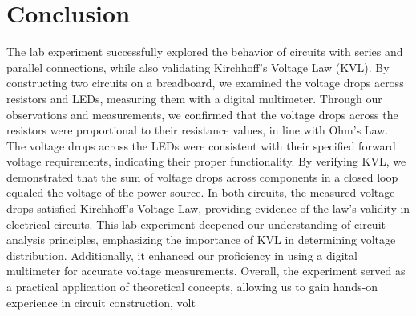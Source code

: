 \section{Conclusion}
The lab experiment successfully explored the behavior of circuits with series and
parallel connections, while also validating Kirchhoff's Voltage Law (KVL). By
constructing two circuits on a breadboard, we examined the voltage drops across
resistors and LEDs, measuring them with a digital multimeter.
Through our observations and measurements, we confirmed that the voltage drops
across the resistors were proportional to their resistance values, in line with Ohm's
Law. The voltage drops across the LEDs were consistent with their specified
forward voltage requirements, indicating their proper functionality.
By verifying KVL, we demonstrated that the sum of voltage drops across
components in a closed loop equaled the voltage of the power source. In both
circuits, the measured voltage drops satisfied Kirchhoff's Voltage Law, providing
evidence of the law's validity in electrical circuits.
This lab experiment deepened our understanding of circuit analysis principles,
emphasizing the importance of KVL in determining voltage distribution.
Additionally, it enhanced our proficiency in using a digital multimeter for accurate
voltage measurements.
Overall, the experiment served as a practical application of theoretical concepts,
allowing us to gain hands-on experience in circuit construction, volt
